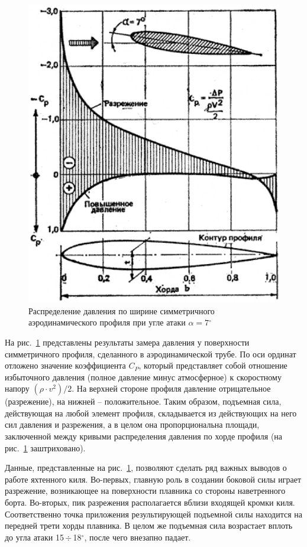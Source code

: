 \documentclass[a4paper, 12pt, twoside, final, book, russian, fittopage, cyremdash]{ncc}
\newcommand{\gr}{\ensuremath{^\circ}\xspace}
\newcommand{\otdo}{\,\ensuremath{\div}\,}
\begin{document}
\begin{figure}[htb]
  \centering
  \includegraphics[scale=0.5]{0009.jpg}
  \caption{Распределение давления по ширине симметричного аэродинамического профиля при угле атаки $\alpha = 7\gr$}
  \label{fig:9}
\end{figure}

На рис.~\ref{fig:9} представлены результаты замера давления у поверхности симметричного профиля, сделанного в аэродинамической трубе. По оси ординат отложено значение коэффициента $C_P$, который представляет собой отношение избыточного давления (полное давление минус атмосферное) к скоростному напору $(\rho \cdot v^2) / 2$. На верхней стороне профиля давление отрицательное (разрежение), на нижней \--- положительное. Таким образом, подъемная сила, действующая на любой элемент профиля, складывается из действующих на него сил давления и разрежения, а в целом она пропорциональна площади, заключенной между кривыми распределения давления по хорде профиля (на рис.~\ref{fig:9} заштриховано).

Данные, представленные на рис.~\ref{fig:9}, позволяют сделать ряд важных выводов о работе яхтенного киля. Во-первых, главную роль в создании боковой силы играет разрежение, возникающее на поверхности плавника со стороны наветренного борта. Во-вторых, пик разрежения располагается вблизи входящей кромки киля. Соответственно точка приложения результирующей подъемной силы находится на передней трети хорды плавника. В целом же подъемная сила возрастает вплоть до угла атаки 15\otdo 18\gr, после чего внезапно падает.
\end{document}
